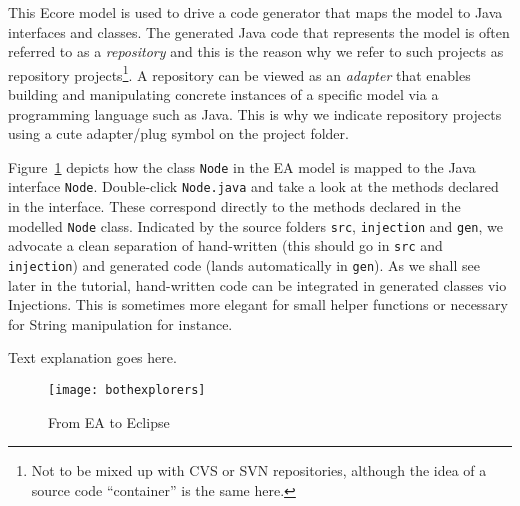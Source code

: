 \begin{enumerate}
This Ecore model is used to drive a code generator that maps the model to Java interfaces and classes.  
The generated Java code that represents the model is often referred to as a \emph{repository} and this is the reason why we refer to such projects as repository projects\footnote{Not to be mixed up with CVS or SVN repositories, although the idea of a source code ``container'' is the same here.}. 
A repository can be viewed as an \emph{adapter} that enables building and manipulating concrete instances of a specific model via a programming language such as Java.  
This is why we indicate repository projects using a cute adapter/plug symbol on the project folder.  

Figure~\ref{fig_fromEAtoEclipse} depicts how the class \texttt{Node} in the EA model is mapped to the Java interface \texttt{Node}.  
Double-click \texttt{Node.java} and take a look at the methods declared in the interface.
These correspond directly to the methods declared in the modelled \texttt{Node} class.  
Indicated by the source folders \texttt{src}, \texttt{injection} and \texttt{gen}, we advocate a clean separation of hand-written (this should go in \texttt{src} and \texttt{injection}) and generated code (lands automatically in \texttt{gen}).  
As we shall see later in the tutorial, hand-written code can be integrated in generated classes vio Injections. 
This is sometimes more elegant for small helper functions or necessary for String manipulation for instance.

\newpage
\texHeader
Text explanation goes here.
\pagebreak

\visHeader

\begin{figure}[htbp]
    \centering
  \texttt{[image: bothexplorers]}
    \caption{From EA to Eclipse}
    \label{fig_fromEAtoEclipse}
\end{figure}



\end{enumerate}

